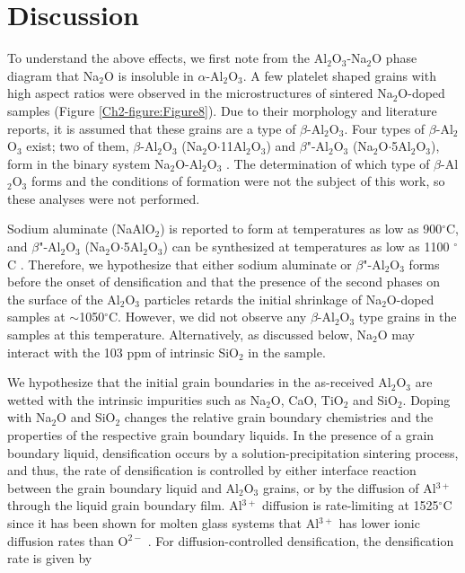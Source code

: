 \section{Discussion}

To understand the above effects, we first note from the Al$_{2}$O$_{3}$-Na$_{2}$O phase diagram \cite{Lambotte2013} that Na$_{2}$O is insoluble in $\alpha$-Al$_{2}$O$_{3}$. A few platelet shaped grains with high aspect ratios were observed in the microstructures of sintered Na$_{2}$O-doped samples (Figure \ref{Ch2-figure:Figure8}). Due to their morphology and literature reports,\cite{Brownmiller1932,PABLOGALAN1959,Rankin1916,Ridgway1936,Duncan1969} it is assumed that these grains are a type of $\beta$-Al$_{2}$O$_{3}$. Four types of $\beta$-Al$_{2}$O$_{3}$ exist; two of them, $\beta$-Al$_{2}$O$_{3}$ (Na$_{2}$O$\cdot$11Al$_{2}$O$_{3}$) and $\beta$"-Al$_{2}$O$_{3}$ (Na$_{2}$O$\cdot$5Al$_{2}$O$_{3}$), form in the binary system Na$_{2}$O-Al$_{2}$O$_{3}$ \cite{Sutorik1998,Stevens1984}. The determination of which type of $\beta$-Al$_{2}$O$_{3}$ forms and the conditions of formation were not the subject of this work, so these analyses were not performed.

Sodium aluminate (NaAlO$_{2}$) is reported to form at temperatures as low as 900$^{\circ}$C,\cite{Christie1978} and $\beta$"-Al$_{2}$O$_{3}$ (Na$_{2}$O$\cdot$5Al$_{2}$O$_{3}$) can be synthesized at temperatures as low as 1100 $^{\circ}$C \cite{Brownmiller1932,Kummer1972,Vries1969}. Therefore, we hypothesize that either sodium aluminate or $\beta$"-Al$_{2}$O$_{3}$ forms before the onset of densification and that the presence of the second phases on the surface of the Al$_{2}$O$_{3}$ particles retards the initial shrinkage of Na$_{2}$O-doped samples at $\sim$1050$^{\circ}$C.  However, we did not observe any $\beta$-Al$_{2}$O$_{3}$ type grains in the samples at this temperature. Alternatively, as discussed below, Na$_{2}$O may interact with the 103 ppm of intrinsic SiO$_{2}$ in the sample.

We hypothesize that the initial grain boundaries in the as-received Al$_{2}$O$_{3}$ are wetted with the intrinsic impurities such as Na$_{2}$O, CaO, TiO$_{2}$ and SiO$_{2}$. Doping with Na$_{2}$O and SiO$_{2}$ changes the relative grain boundary chemistries and the properties of the respective grain boundary liquids. In the presence of a grain boundary liquid, densification occurs by a solution-precipitation sintering process, and thus, the rate of densification is controlled by either interface reaction between the grain boundary liquid and Al$_{2}$O$_{3}$ grains, or by the diffusion of Al$^{3+}$ through the liquid grain boundary film. Al$^{3+}$ diffusion is rate-limiting at 1525$^{\circ}$C since it has been shown for molten glass systems that Al$^{3+}$ has lower ionic diffusion rates than O$^{2-}$ \cite{Terai1975}. For diffusion-controlled densification, the densification rate is given by \cite{Kwon1990,Kwon1991}

